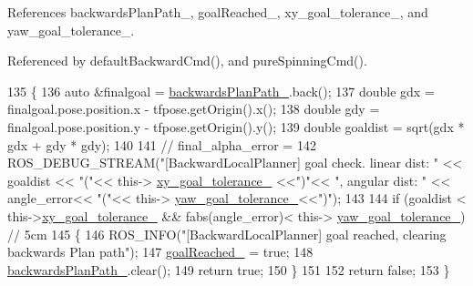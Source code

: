 References backwards\+Plan\+Path\+\_\+, goal\+Reached\+\_\+, xy\+\_\+goal\+\_\+tolerance\+\_\+, and yaw\+\_\+goal\+\_\+tolerance\+\_\+.



Referenced by default\+Backward\+Cmd(), and pure\+Spinning\+Cmd().


\begin{DoxyCode}
135 \{
136     \textcolor{keyword}{auto} &finalgoal = \hyperlink{classcl__move__base__z_1_1backward__local__planner_1_1BackwardLocalPlanner_ad9cde5c85f782cab2ddb4030e3c3f2cf}{backwardsPlanPath\_}.back();
137     \textcolor{keywordtype}{double} gdx = finalgoal.pose.position.x - tfpose.getOrigin().x();
138     \textcolor{keywordtype}{double} gdy = finalgoal.pose.position.y - tfpose.getOrigin().y();
139     \textcolor{keywordtype}{double} goaldist = sqrt(gdx * gdx + gdy * gdy);
140 
141     \textcolor{comment}{// final\_alpha\_error = }
142     ROS\_DEBUG\_STREAM(\textcolor{stringliteral}{"[BackwardLocalPlanner] goal check. linear dist: "} << goaldist << \textcolor{stringliteral}{"("}<< this->
      \hyperlink{classcl__move__base__z_1_1backward__local__planner_1_1BackwardLocalPlanner_aa4ec2c87947a3c08f8278eff052e7c8c}{xy\_goal\_tolerance\_} <<\textcolor{stringliteral}{")"}<< \textcolor{stringliteral}{", angular dist: "} << angle\_error<< \textcolor{stringliteral}{"("}<< this->
      \hyperlink{classcl__move__base__z_1_1backward__local__planner_1_1BackwardLocalPlanner_a9c5104d328041fcde5a3c02664abad48}{yaw\_goal\_tolerance\_}<<\textcolor{stringliteral}{")"});
143 
144     \textcolor{keywordflow}{if} (goaldist < this->\hyperlink{classcl__move__base__z_1_1backward__local__planner_1_1BackwardLocalPlanner_aa4ec2c87947a3c08f8278eff052e7c8c}{xy\_goal\_tolerance\_} &&  fabs(angle\_error)< this->
      \hyperlink{classcl__move__base__z_1_1backward__local__planner_1_1BackwardLocalPlanner_a9c5104d328041fcde5a3c02664abad48}{yaw\_goal\_tolerance\_}) \textcolor{comment}{// 5cm}
145     \{
146         ROS\_INFO(\textcolor{stringliteral}{"[BackwardLocalPlanner] goal reached, clearing backwards Plan path"});
147         \hyperlink{classcl__move__base__z_1_1backward__local__planner_1_1BackwardLocalPlanner_ad443c52ef585a8eab0364f0909222f51}{goalReached\_} = \textcolor{keyword}{true};
148         \hyperlink{classcl__move__base__z_1_1backward__local__planner_1_1BackwardLocalPlanner_ad9cde5c85f782cab2ddb4030e3c3f2cf}{backwardsPlanPath\_}.clear();
149         \textcolor{keywordflow}{return} \textcolor{keyword}{true};
150     \}
151 
152     \textcolor{keywordflow}{return} \textcolor{keyword}{false};
153 \}
\end{DoxyCode}
